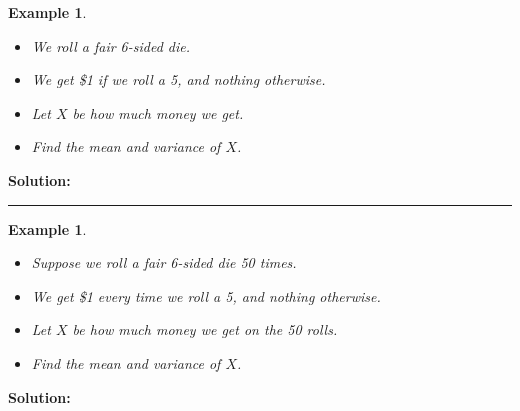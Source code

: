 \documentclass[12pt]{amsart}
\newtheorem{example}[theorem]{Example}
\begin{document}
{%
\begin{example}\ %
\begin{itemize}
\item We roll a fair 6-sided die. 
\item We get \$1 if we roll a 5, and nothing otherwise.
\item Let $X$ be how much money we get.
\item Find the mean and variance of $X$.
\end{itemize}

\end{example}
\textbf{Solution:}
\vspace{5cm}
\hrule
\vspace{.5cm}



\begin{example}\ %
\begin{itemize}
\item Suppose we roll a fair 6-sided die 50 times. 
\item We get \$1 every time we roll a 5, and nothing otherwise.
\item Let $X$ be how much money we get on the 50 rolls.
\item Find the mean and variance of $X$.
\end{itemize}

\end{example}
\textbf{Solution:}


}  %
\end{document}
